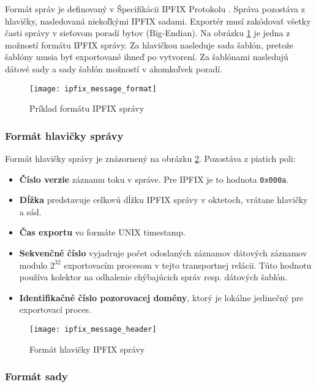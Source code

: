 Formát správ je definovaný v Špecifikácii IPFIX Protokolu \citep{rfc5101}. Správa pozostáva z 
hlavičky, nasledovaná niekoľkými IPFIX sadami. 
Exportér musí zakódovať všetky časti správy v sieťovom poradí bytov (Big-Endian).
Na obrázku \ref{o:ipfix_message_format} je jedna z možností formátu IPFIX správy. Za hlavičkou nasleduje sada šablón, pretože
šablóny musia byť exportované ihneď po vytvorení. Za šablónami nasledujú dátové sady a sady šablón možností 
v akomkoľvek poradí.

\begin{figure}[ht!]
\centering
\texttt{[image: ipfix\_message\_format]}
\caption{Príklad formátu IPFIX správy}\label{o:ipfix_message_format}
\end{figure}

\subsubsection{Formát hlavičky správy}

Formát hlavičky správy je znázornený na obrázku \ref{o:ipfix_message_header}. Pozostáva z piatich poli:
\begin{itemize}
 \item \textbf{Číslo verzie} záznamu toku v správe. Pre IPFIX je to hodnota \verb|0x000a|.
 \item \textbf{Dĺžka} predstavuje celkovú dĺžku IPFIX správy v oktetoch, vrátane hlavičky a sád. 
 \item \textbf{Čas exportu} vo formáte UNIX timestamp. 
 \item \textbf{Sekvenčné číslo} vyjadruje počet odoslaných záznamov dátových záznamov modulo $2^{32}$  
 exportovacím procesom v tejto transportnej relácii. Túto hodnotu používa kolektor na odhalenie chýbajúcich 
 správ resp. dátových šablón.
 \item \textbf{Identifikačné číslo pozorovacej domény}, ktorý je lokálne jedinečný pre exportovací proces.
 \end{itemize}
 
\begin{figure}[ht!]
\centering
\texttt{[image: ipfix\_message\_header]}
\caption{Formát hlavičky IPFIX správy}\label{o:ipfix_message_header}
\end{figure}

\subsubsection{Formát sady}

